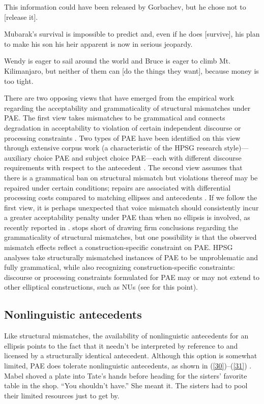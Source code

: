 \documentclass[output=paper
	        ,collection
	        ,collectionchapter
 	        ,biblatex
                ,babelshorthands
                ,newtxmath
                ,draftmode
                ,colorlinks, citecolor=brown
]{langscibook}
\begin{document}
{\ea This information could have been released by Gorbachev, but he chose not to [release it]. \citep[37]{Hardt1993} \label{27}\z

\ea Mubarak's survival is impossible to predict and, even if he does [survive], his plan to make his son his heir apparent is now in serious jeopardy. \citep{Miller2014a} \label{28}\z

\ea Wendy is eager to sail around the world and Bruce is eager to climb Mt. Kilimanjaro, but neither of them can [do the things they want], because money is too tight. \citep{Webber79a} \label{29}\z

There are two opposing views that have emerged from the empirical work regarding the acceptability and grammaticality of structural mismatches under PAE. The first view takes mismatches to be grammatical and connects degradation in acceptability to violation of certain independent discourse \citep{Kehler2002, Miller2011, %
Miller2014a, Miller2014b} or processing constraints \citep{Kim2011}. Two types of PAE have been identified on this view through extensive corpus work (a characteristic of the HPSG research style)---auxiliary choice PAE and subject choice PAE---each with different discourse requirements with respect to the antecedent \citep{Miller2011, Miller2014a, Miller2014b}. The second view assumes that there is a grammatical ban on structural mismatch but violations thereof may be repaired under certain conditions; repairs are associated with differential processing costs compared to matching ellipses and antecedents \citep{Arregui2006, Grant2012}. If we follow the first view, it is perhaps unexpected that voice mismatch should consistently incur a greater acceptability penalty under PAE than when no ellipsis is involved, as recently reported in \citet{Kim2011}. \citet{Kim2011} stops short of drawing firm conclusions regarding the grammaticality of structural mismatches, but one possibility is that the observed mismatch effects reflect a construction-specific constraint on PAE. HPSG analyses take structurally mismatched instances of PAE to be unproblematic and fully grammatical, while also recognizing construction-specific constraints: discourse or processing constraints formulated for PAE may or may not extend to other elliptical constructions, such as NUs (see \citealt{Ginzburg2018} for this point).


\subsection{Nonlinguistic antecedents}
Like structural mismatches, the availability of nonlinguistic antecedents for an ellipsis points to the fact that it needn't be interpreted by reference to and licensed by a structurally identical antecedent. Although this option is somewhat limited, PAE does tolerate nonlinguistic antecedents, as shown in (\ref{30})--(\ref{31}) \citep[see also][]{Hankamer1976, Schachter1977}.
\ea Mabel shoved a plate into Tate's hands before heading for the sisters' favorite table in the shop. ``You shouldn't have.'' She meant it. The sisters had to pool their limited resources
just to get by. \citep[ex. 23][]{Miller2014b}\label{30}\z

}
\end{document}

